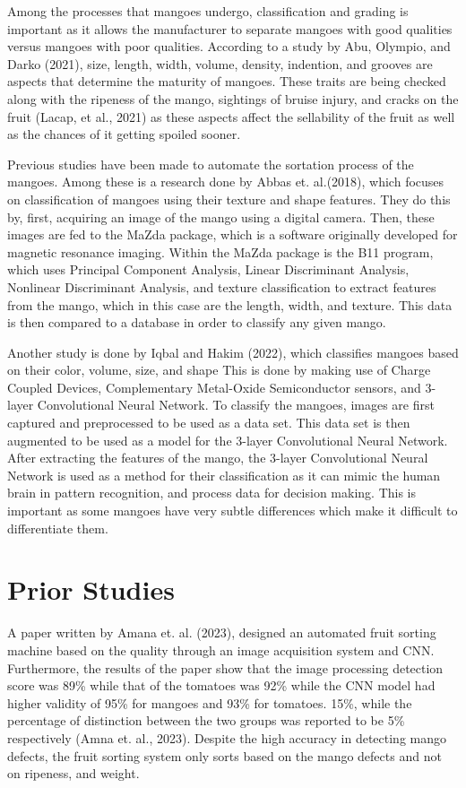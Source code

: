 Among the processes that mangoes undergo, classification and grading is important as it allows the manufacturer to separate mangoes with good qualities versus mangoes with poor qualities. According to a study by Abu, Olympio, and Darko (2021), size, length, width, volume, density, indention, and grooves are aspects that determine the maturity of mangoes. These traits are being checked along with the ripeness of the mango, sightings of bruise injury, and cracks on the fruit (Lacap, et al., 2021) as these aspects affect the sellability of the fruit as well as the chances of it getting spoiled sooner.

Previous studies have been made to automate the sortation process of the mangoes. Among these is a research done by Abbas et. al.(2018), which focuses on classification of mangoes using their texture and shape features. They do this by, first, acquiring an image of the mango using a digital camera. Then, these images are fed to the MaZda package, which is a software originally developed for magnetic resonance imaging. Within the MaZda package is the B11 program, which uses Principal Component Analysis, Linear Discriminant Analysis, Nonlinear Discriminant Analysis, and texture classification to extract features from the mango, which in this case are the length, width, and texture. This data is then compared to a database in order to classify any given mango.  

Another study is done by Iqbal and Hakim (2022), which classifies mangoes based on their color, volume, size, and shape This is done by making use of Charge Coupled Devices, Complementary Metal-Oxide Semiconductor sensors, and 3-layer Convolutional Neural Network. To classify the mangoes, images are first captured and preprocessed to be used as a data set. This data set is then augmented to be used as a model for the 3-layer Convolutional Neural Network. After extracting the features of the mango, the 3-layer Convolutional Neural Network is used as a method for their classification as it can mimic the human brain in pattern recognition, and process data for decision making. This is important as some mangoes have very subtle differences which make it difficult to differentiate them.



\section{Prior Studies}

A paper written by Amana et. al. (2023), designed an automated fruit sorting machine based on the quality through 
an image acquisition system and CNN. Furthermore, the results of the paper show that the image processing detection 
score was 89\% while that of the tomatoes was 92\% while the CNN model had higher validity of 95\% for mangoes and 93\% 
for tomatoes. 15\%, while the percentage of distinction between the two groups was reported to be 5\% respectively 
(Amna et. al., 2023). Despite the high accuracy in detecting mango defects, the fruit sorting system only sorts based 
on the mango defects and not on ripeness, and weight.


